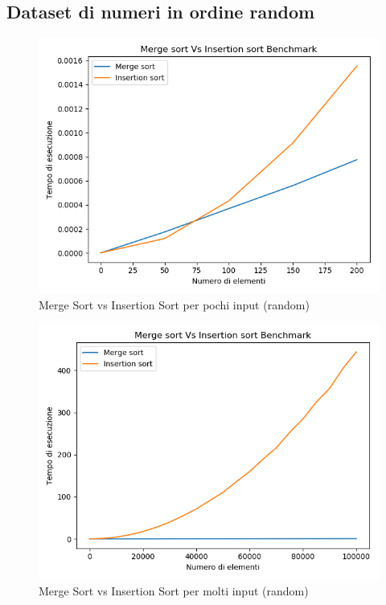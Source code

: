 \documentclass[a4paper]{article}
\begin{document}
\subsection{Dataset di numeri in ordine random}		

		\begin{figure}[!htb]
		\centering
		\includegraphics[scale=0.3]{6}
		\caption{Merge Sort vs Insertion Sort per pochi input (random)}
		\label{fig:SmallInsMergeRandom}
		\end{figure}
		
		\begin{figure}[!htb]
		\centering
		\includegraphics[scale=0.3]{5}
		\caption{Merge Sort vs Insertion Sort per molti input (random)}
		\label{fig:BigInsMergeRandom}
		\end{figure}
\newpage
\end{document}

